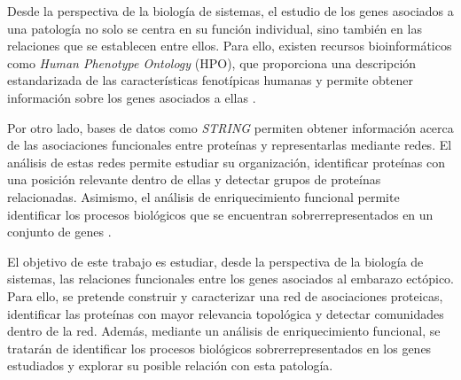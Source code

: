 Desde la perspectiva de la biología de sistemas, el estudio de los genes asociados a una patología no solo se centra en su función individual, sino también en las relaciones que se establecen entre ellos. Para ello, existen recursos bioinformáticos como \textit{Human Phenotype Ontology} (HPO), que proporciona una descripción estandarizada de las características fenotípicas humanas y permite obtener información sobre los genes asociados a ellas \cite{Gargano2024}.

Por otro lado, bases de datos como \textit{STRING} permiten obtener información acerca de las asociaciones funcionales entre proteínas y representarlas mediante redes. El análisis de estas redes permite estudiar su organización, identificar proteínas con una posición relevante dentro de ellas y detectar grupos de proteínas relacionadas. Asimismo, el análisis de enriquecimiento funcional permite identificar los procesos biológicos que se encuentran sobrerrepresentados en un conjunto de genes \cite{Szklarczyk2025}.

El objetivo de este trabajo es estudiar, desde la perspectiva de la biología de sistemas, las relaciones funcionales entre los genes asociados al embarazo ectópico. Para ello, se pretende construir y caracterizar una red de asociaciones proteicas, identificar las proteínas con mayor relevancia topológica y detectar comunidades dentro de la red. Además, mediante un análisis de enriquecimiento funcional, se tratarán de identificar los procesos biológicos sobrerrepresentados en los genes estudiados y explorar su posible relación con esta patología.
